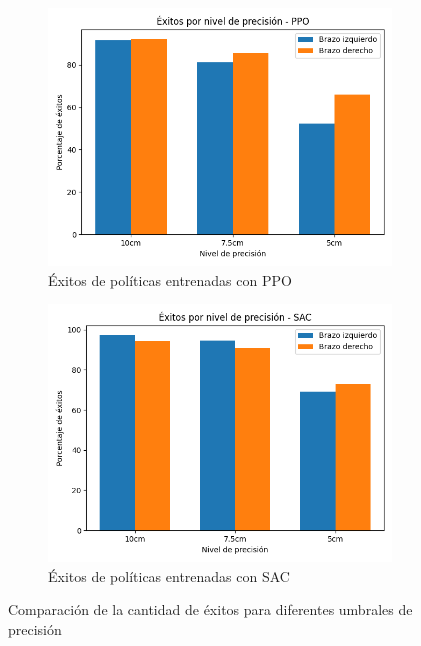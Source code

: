 \begin{figure}[h!]
	\centering
	
	\begin{subfigure}[b]{0.45\textwidth}
		\centering
		\includegraphics[width=\textwidth]{images/resultados/success_comparison_ppo}
		\caption{Éxitos de políticas entrenadas con PPO}
		\label{fig:ppo-test}
	\end{subfigure}
	\hfill
	\begin{subfigure}[b]{0.45\textwidth}
		\centering
		\includegraphics[width=\textwidth]{images/resultados/success_comparison_sac}
		\caption{Éxitos de políticas entrenadas con SAC}
		\label{fig:sac-test}
	\end{subfigure}
	
	\caption{Comparación de la cantidad de éxitos para diferentes umbrales de precisión}
	\label{fig:test-policy-success}
\end{figure}